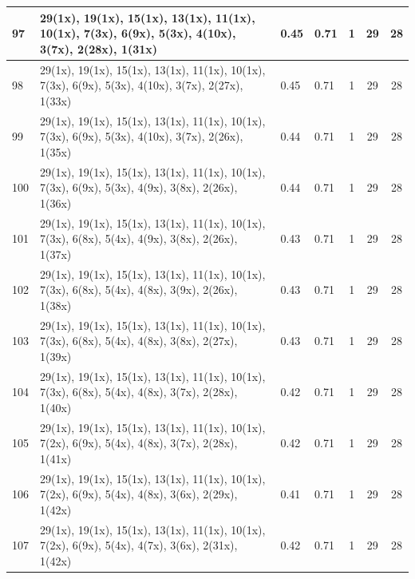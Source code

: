 \begin{small}
\begin{longtable}{|p{0.5cm}|p{9cm}|p{1.3cm}|p{1.3cm}|c|c|c|}
  97 & 29(1x), 19(1x), 15(1x), 13(1x), 11(1x), 10(1x), 7(3x), 6(9x), 5(3x), 4(10x), 3(7x), 2(28x), 1(31x) & \cellcolor{colorGood}  0.45 & \cellcolor{colorGood} 0.71 & 1 & 29 & \cellcolor{colorBad} 28 \\   \hline
  98 & 29(1x), 19(1x), 15(1x), 13(1x), 11(1x), 10(1x), 7(3x), 6(9x), 5(3x), 4(10x), 3(7x), 2(27x), 1(33x) & \cellcolor{colorGood}  0.45 & \cellcolor{colorGood} 0.71 & 1 & 29 & \cellcolor{colorBad} 28 \\   \hline
  99 & 29(1x), 19(1x), 15(1x), 13(1x), 11(1x), 10(1x), 7(3x), 6(9x), 5(3x), 4(10x), 3(7x), 2(26x), 1(35x) & \cellcolor{colorGood}  0.44 & \cellcolor{colorGood} 0.71 & 1 & 29 & \cellcolor{colorBad} 28 \\   \hline
  100 & 29(1x), 19(1x), 15(1x), 13(1x), 11(1x), 10(1x), 7(3x), 6(9x), 5(3x), 4(9x), 3(8x), 2(26x), 1(36x) & \cellcolor{colorGood}  0.44 & \cellcolor{colorGood} 0.71 & 1 & 29 & \cellcolor{colorBad} 28 \\   \hline
  101 & 29(1x), 19(1x), 15(1x), 13(1x), 11(1x), 10(1x), 7(3x), 6(8x), 5(4x), 4(9x), 3(8x), 2(26x), 1(37x) & \cellcolor{colorGood}  0.43 & \cellcolor{colorGood} 0.71 & 1 & 29 & \cellcolor{colorBad} 28 \\   \hline
  102 & 29(1x), 19(1x), 15(1x), 13(1x), 11(1x), 10(1x), 7(3x), 6(8x), 5(4x), 4(8x), 3(9x), 2(26x), 1(38x) & \cellcolor{colorGood}  0.43 & \cellcolor{colorGood} 0.71 & 1 & 29 & \cellcolor{colorBad} 28 \\   \hline
  103 & 29(1x), 19(1x), 15(1x), 13(1x), 11(1x), 10(1x), 7(3x), 6(8x), 5(4x), 4(8x), 3(8x), 2(27x), 1(39x) & \cellcolor{colorGood}  0.43 & \cellcolor{colorGood} 0.71 & 1 & 29 & \cellcolor{colorBad} 28 \\   \hline
  104 & 29(1x), 19(1x), 15(1x), 13(1x), 11(1x), 10(1x), 7(3x), 6(8x), 5(4x), 4(8x), 3(7x), 2(28x), 1(40x) & \cellcolor{colorGood}  0.42 & \cellcolor{colorGood} 0.71 & 1 & 29 & \cellcolor{colorBad} 28 \\   \hline
  105 & 29(1x), 19(1x), 15(1x), 13(1x), 11(1x), 10(1x), 7(2x), 6(9x), 5(4x), 4(8x), 3(7x), 2(28x), 1(41x) & \cellcolor{colorGood}  0.42 & \cellcolor{colorGood} 0.71 & 1 & 29 & \cellcolor{colorBad} 28 \\   \hline
  106 & 29(1x), 19(1x), 15(1x), 13(1x), 11(1x), 10(1x), 7(2x), 6(9x), 5(4x), 4(8x), 3(6x), 2(29x), 1(42x) & \cellcolor{colorGood}  0.41 & \cellcolor{colorGood} 0.71 & 1 & 29 & \cellcolor{colorBad} 28 \\   \hline
  107 & 29(1x), 19(1x), 15(1x), 13(1x), 11(1x), 10(1x), 7(2x), 6(9x), 5(4x), 4(7x), 3(6x), 2(31x), 1(42x) & \cellcolor{colorGood}  0.42 & \cellcolor{colorGood} 0.71 & 1 & 29 & \cellcolor{colorBad} 28 \\   \hline

\end{longtable}
\end{small}
